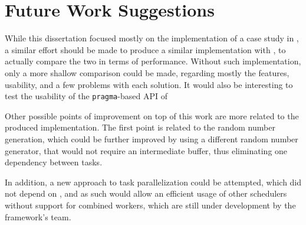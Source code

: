 \documentclass[main.tex]{subfiles}
\begin{document}
\chapter{Future Work Suggestions}

While this dissertation focused mostly on the implementation of a case study in \starpu, a similar effort should be made to produce a similar implementation with \gama, to actually compare the two in terms of performance. Without such implementation, only a more shallow comparison could be made, regarding mostly the features, usability, and a few problems with each solution.
It would also be interesting to test the usability of the \texttt{pragma}-based API of \starpu

Other possible points of improvement on top of this work are more related to the produced implementation. The first point is related to the random number generation, which could be further improved by using a different random number generator, that would not require an intermediate buffer, thus eliminating one dependency between tasks.

In addition, a new approach to task parallelization could be attempted, which did not depend on \openmp, and as such would allow an efficient usage of other \starpu schedulers without support for combined workers, which are still under development by the framework's team.
\end{document}
